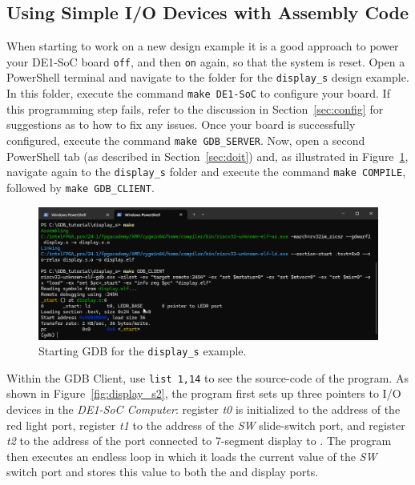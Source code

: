 \documentclass[11pt, twoside, pdftex]{article}
\newcommand{\red}[1]{{\color{red}\sf{#1}}}
\begin{document}
\subsection{Using Simple I/O Devices with Assembly Code}
\label{sec:simpleIO}

When starting to work on a new design example it is a good approach to power your DE1-SoC
board \texttt{off}, and then \texttt{on} again, so that the system is reset.   
Open a PowerShell terminal and navigate to the folder for the \texttt{display\_s} design
example. In this folder, execute the command \texttt{make DE1-SoC} to configure your board. 
If this programming step fails, refer to the discussion in Section~\ref{sec:config} for
suggestions as to how to fix any issues. Once your board is successfully configured,
execute the command \texttt{make GDB\_SERVER}. Now, open a second
PowerShell tab (as described in Section~\ref{sec:doit}) and, as illustrated in 
Figure~\ref{fig:display_s1}, navigate again to the \texttt{display\_s} folder and 
execute the command \texttt{make COMPILE}, followed by \texttt{make GDB\_CLIENT}.

\begin{figure}[h]
    \begin{center}
        \includegraphics[scale=.6]{figures/display_s1.png}
        \caption{Starting GDB for the \texttt{display\_s} example.}
        \label{fig:display_s1}
    \end{center}
\end{figure}

Within the GDB Client, use \texttt{list 1,14} to see the source-code of the program. As
shown in  Figure~\ref{fig:display_s2}, the program first sets up three pointers to I/O
devices in the {\it DE1-SoC Computer}: register {\it t0} is initialized to the address of 
the \red{\it LEDR} red light port, register {\it t1} to the address of the {\it SW} slide-switch
port, and register {\it t2} to the address of the port connected to 7-segment display 
\red{\it HEX3} to \red{\it HEX0}. The program then executes an endless loop in 
which it loads the current value of the {\it SW} switch port and stores this value to 
both the \red{\it LEDR} and \red{\it HEX0} display ports. 
\end{document}

